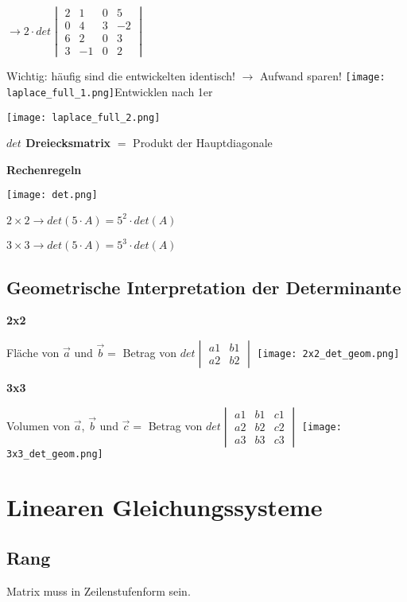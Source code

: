 \begin{multicols*}{3}
{\begin{multicols}{2}
            {  $ \rightarrow  2 \cdot det \begin{vmatrix} 2 & 1 & 0 & 5 \\ 0 & 4 & 3 & -2 \\ 6 & 2 &0 & 3 \\ 3 & -1 &0 & 2 \end{vmatrix} $}
        \end{multicols}}
    {\small{Wichtig: häufig sind die entwickelten identisch! $\rightarrow$ Aufwand sparen!}}
    {\texttt{[image: laplace\_full\_1.png]}Entwicklen nach 1er}

    {\texttt{[image: laplace\_full\_2.png]}}


    \textbf{$det$ Dreiecksmatrix}
    $ = $ Produkt der Hauptdiagonale
    \WhiteSpace

    \textbf{Rechenregeln}

    {\texttt{[image: det.png]}}

    $2\times 2 \rightarrow det(5 \cdot A) = 5^2 \cdot det(A)$

    $3\times 3 \rightarrow det(5 \cdot A) = 5^3 \cdot det(A)$

    \WhiteSpace
    \subsection{Geometrische Interpretation der Determinante }
    {\textbf{2x2}}

    {Fläche von $\vec{a} $ und $ \vec{b} = $ Betrag von $ det \begin{vmatrix} a1 & b1  \\ a2 & b2 \end{vmatrix} $}
    {\texttt{[image: 2x2\_det\_geom.png]}}




    \textbf{3x3}

    {Volumen von $\vec{a} $, $ \vec{b}$ und $\vec{c} = $ Betrag von $   det \begin{vmatrix} a1 & b1 & c1 \\ a2 & b2 & c2 \\ a3 & b3 & c3  \end{vmatrix}  $}
    {\texttt{[image: 3x3\_det\_geom.png]}}
    \mbox{}


    \section{Linearen Gleichungssysteme}
    \subsection{Rang}
    {Matrix muss in Zeilenstufenform sein.}


\end{multicols*}
